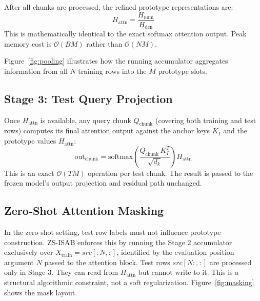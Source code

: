 \documentclass[10pt]{article}
\begin{document}
After all chunks are processed, the refined prototype representations are:
\begin{equation}
    H_{\text{attn}} = \frac{H_{\text{num}}}{H_{\text{den}}}
\end{equation}
This is mathematically identical to the exact softmax attention output. Peak memory cost is $\mathcal{O}(BM)$ rather than $\mathcal{O}(NM)$.

Figure~\ref{fig:pooling} illustrates how the running accumulator aggregates information from all $N$ training rows into the $M$ prototype slots.

\subsection{Stage 3: Test Query Projection}

Once $H_{\text{attn}}$ is available, any query chunk $Q_{\text{chunk}}$ (covering both training and test rows) computes its final attention output against the anchor keys $K_I$ and the prototype values $H_{\text{attn}}$:
\begin{equation}
    \text{out}_{\text{chunk}} = \text{softmax}\!\left(\frac{Q_{\text{chunk}}\, K_I^T}{\sqrt{d_k}}\right) H_{\text{attn}}
\end{equation}
This is an exact $\mathcal{O}(TM)$ operation per test chunk. The result is passed to the frozen model's output projection and residual path unchanged.

\subsection{Zero-Shot Attention Masking}

In the zero-shot setting, test row labels must not influence prototype construction. ZS-ISAB enforces this by running the Stage 2 accumulator exclusively over $X_{\text{train}} = src[:N, :]$, identified by the evaluation position argument $N$ passed to the attention block. Test rows $src[N:, :]$ are processed only in Stage 3. They can read from $H_{\text{attn}}$ but cannot write to it. This is a structural algorithmic constraint, not a soft regularization. Figure~\ref{fig:masking} shows the mask layout.
\end{document}
